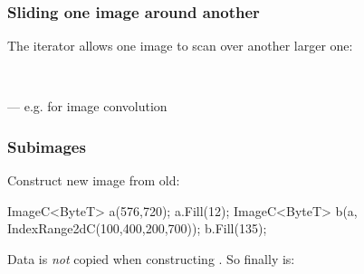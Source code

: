 \documentclass[landscape]{beamer}
\begin{document}
\begin{frame}[fragile]\frametitle{Sliding one image around another} 

 The  iterator allows one image to scan over another larger one:\\\vfill

\\\vfill


 --- e.g. for image convolution
\end{frame}

\begin{frame}[fragile]\frametitle{Subimages}

Construct new image from old:

\begin{Code}
  ImageC<ByteT> a(576,720);
  a.Fill(12);
  ImageC<ByteT> b(a, IndexRange2dC(100,400,200,700));
  b.Fill(135);
\end{Code}

Data is {\em not} copied when constructing .  So  finally is:


\end{frame}
\end{document}
